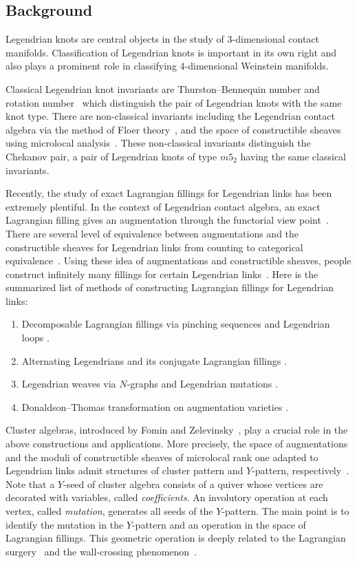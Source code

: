 \subsection{Background}
Legendrian knots are central objects in the study of 3-dimensional
contact manifolds. Classification of Legendrian knots is important in its
own right and also plays a prominent role in classifying 4-dimensional
Weinstein manifolds.

Classical Legendrian knot invariants are Thurston--Bennequin number and rotation
number~\cite{Gei2008} which distinguish the pair of Legendrian knots with the
same knot type. There are non-classical invariants including the Legendrian
contact algebra via the method of Floer theory~\cite{EGH2000, Che2002}, and
the space of constructible sheaves using microlocal
analysis~\cite{GKS2012,STZ2017}. These non-classical invariants distinguish
the Chekanov pair, a pair of Legendrian knots of type $m5_2$ having the same
classical invariants.


Recently, the study of exact Lagrangian fillings for Legendrian links has
been extremely plentiful. In the context of Legendrian contact algebra, an exact
Lagrangian filling gives an augmentation through the functorial view 
point~\cite{EHK2016}. There are several level of equivalence between 
augmentations
and the constructible sheaves for Legendrian links from counting to
categorical equivalence~\cite{NRSSZ2015}. 
Using these idea of
augmentations and constructible sheaves, people construct infinitely many fillings for certain Legendrian links~\cite{CG2020, GSW2020b,
CZ2020}. Here is the summarized list of methods of constructing Lagrangian
fillings for Legendrian links:
\begin{enumerate}
\item Decomposable Lagrangian fillings via pinching sequences and Legendrian loops \cite{EHK2016, Kal2006, CN2021}.
\item Alternating Legendrians and its conjugate Lagrangian fillings
\cite{STWZ2019}. 
\item Legendrian weaves via $N$-graphs and Legendrian mutations \cite{TZ2018, CZ2020}. 
\item Donaldson--Thomas transformation on augmentation varieties
\cite{SW2019, GSW2020a, GSW2020b}.
\end{enumerate}


Cluster algebras, introduced by Fomin and Zelevinsky~\cite{FZ1_2002}, play a crucial role in
the above constructions and applications. More precisely, the space of
augmentations and the moduli of constructible sheaves of microlocal rank one adapted to
Legendrian links admit structures of cluster pattern and $Y$-pattern, respectively~\cite{STWZ2019, SW2019, GSW2020a}. 
Note that a $Y$-seed of cluster algebra consists of a quiver whose vertices are
decorated with variables, called \emph{coefficients}. An involutory operation at each vertex,
called \emph{mutation}, generates all seeds of the $Y$-pattern.
The main point is to identify the
mutation in the $Y$-pattern and an operation in the space of Lagrangian
fillings. This geometric operation is deeply related to the Lagrangian surgery~\cite{Pol1991} and
the wall-crossing phenomenon~\cite{Aur2007}.


